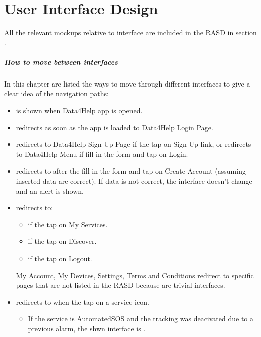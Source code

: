 \documentclass[../DD.tex]{subfiles}
\begin{document}
 \chapter{User Interface Design}
	All the relevant mockups relative to  interface are included in the RASD in section .
	\paragraph{How to move between interfaces}
	In this chapter are listed the ways to move through different interfaces to give a clear idea of the navigation paths:
	\begin{itemize}
		\item{ is shown when Data4Help app is opened.}
		\item{ redirects as soon as the app is loaded to Data4Help Login Page.}
		\item{ redirects to Data4Help Sign Up Page if the  tap on Sign Up link, or redirects to Data4Help Menu if  fill in the form and tap on Login.}
		\item{ redirects to  after the  fill in the form and tap on Create Account (assuming inserted data are correct). If data is not correct, the interface doesn't change and an alert is shown.}
		\item{ redirects to:}
			\begin{itemize}
				\item{ if the  tap on My Services.}
				\item{ if the  tap on Discover.}
				\item{ if the  tap on Logout.}				
			\end{itemize}
			My Account, My Devices, Settings, Terms and Conditions redirect to specific pages that are not listed in the RASD because are trivial interfaces. 
		\item{ redirects to  when the  tap on a service icon.}
			\begin{itemize}
				\item{If the service is AutomatedSOS and the tracking was deacivated due to a previous alarm, the shwn interface is .}
			\end{itemize}

\end{itemize}
\end{document}
